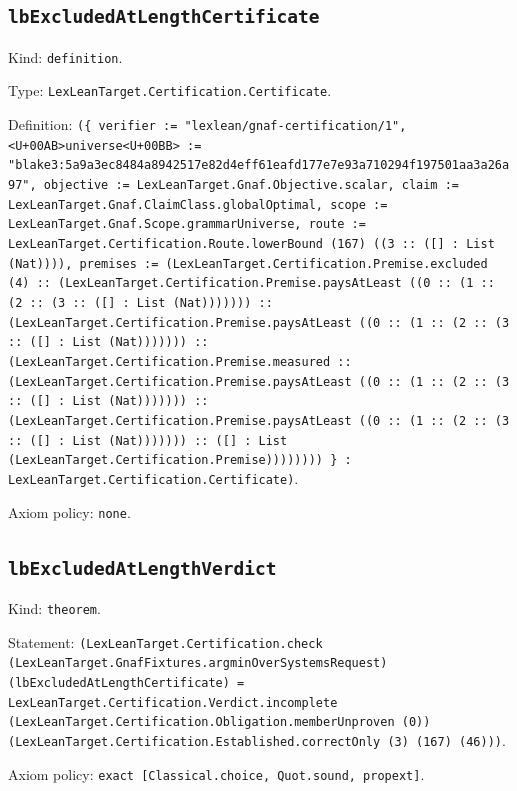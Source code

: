 \documentclass[11pt]{article}
\begin{document}
\subsection*{\texttt{lbExcludedAtLengthCertificate}}
\noindent Kind: \texttt{definition}.\par
\noindent Type: \texttt{LexLeanTarget.Certification.Certificate}.\par
\noindent Definition: \texttt{(\{ verifier := "lexlean/gnaf-certification/1", <U+00AB>universe<U+00BB> := "blake3:5a9a3ec8484a8942517e82d4eff61eafd177e7e93a710294f197501aa3a26a97", objective := LexLeanTarget.Gnaf.Objective.scalar, claim := LexLeanTarget.Gnaf.ClaimClass.globalOptimal, scope := LexLeanTarget.Gnaf.Scope.grammarUniverse, route := LexLeanTarget.Certification.Route.lowerBound (167) ((3 :: ([] : List (Nat)))), premises := (LexLeanTarget.Certification.Premise.excluded (4) :: (LexLeanTarget.Certification.Premise.paysAtLeast ((0 :: (1 :: (2 :: (3 :: ([] : List (Nat))))))) :: (LexLeanTarget.Certification.Premise.paysAtLeast ((0 :: (1 :: (2 :: (3 :: ([] : List (Nat))))))) :: (LexLeanTarget.Certification.Premise.measured :: (LexLeanTarget.Certification.Premise.paysAtLeast ((0 :: (1 :: (2 :: (3 :: ([] : List (Nat))))))) :: (LexLeanTarget.Certification.Premise.paysAtLeast ((0 :: (1 :: (2 :: (3 :: ([] : List (Nat))))))) :: ([] : List (LexLeanTarget.Certification.Premise)))))))) \} : LexLeanTarget.Certification.Certificate)}.\par
\noindent Axiom policy: \texttt{none}.\par
\subsection*{\texttt{lbExcludedAtLengthVerdict}}
\noindent Kind: \texttt{theorem}.\par
\noindent Statement: \texttt{(LexLeanTarget.Certification.check (LexLeanTarget.GnafFixtures.argminOverSystemsRequest) (lbExcludedAtLengthCertificate) = LexLeanTarget.Certification.Verdict.incomplete (LexLeanTarget.Certification.Obligation.memberUnproven (0)) (LexLeanTarget.Certification.Established.correctOnly (3) (167) (46)))}.\par
\noindent Axiom policy: \texttt{exact [Classical.choice, Quot.sound, propext]}.\par
\end{document}
